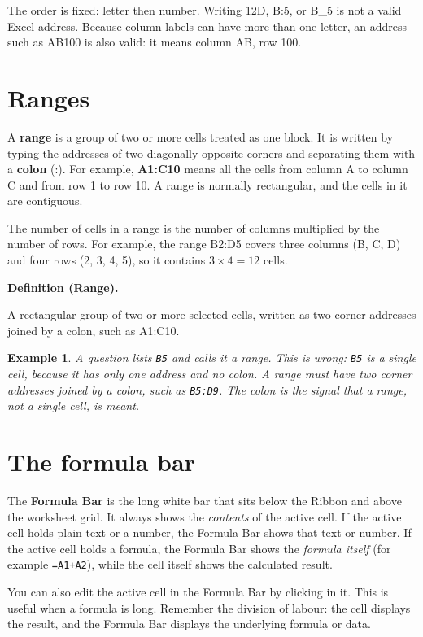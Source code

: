 \documentclass[11pt]{article}
\newtheorem{example}{Example}[section]
\newenvironment{definitionbox}[1]{%
  \par\noindent\textbf{Definition (#1).}\ \itshape
}{\par\vspace{0.3em}}
\begin{document}
The order is fixed: letter then number. Writing 12D, B:5, or B\_5 is not a
valid Excel address. Because column labels can have more than one letter, an
address such as AB100 is also valid: it means column AB, row 100.

\section{Ranges}
A \textbf{range} is a group of two or more cells treated as one block. It is
written by typing the addresses of two diagonally opposite corners and
separating them with a \textbf{colon} (:). For example, \textbf{A1:C10}
means all the cells from column A to column C and from row 1 to row 10. A
range is normally rectangular, and the cells in it are contiguous.

The number of cells in a range is the number of columns multiplied by the
number of rows. For example, the range B2:D5 covers three columns (B, C, D)
and four rows (2, 3, 4, 5), so it contains $3 \times 4 = 12$ cells.

\begin{definitionbox}{Range}
A rectangular group of two or more selected cells, written as two corner
addresses joined by a colon, such as A1:C10.
\end{definitionbox}

\begin{example}
A question lists \texttt{B5} and calls it a range. This is wrong: \texttt{B5}
is a \emph{single} cell, because it has only one address and no colon. A
range must have two corner addresses joined by a colon, such as
\texttt{B5:D9}. The colon is the signal that a range, not a single cell, is
meant.
\end{example}

\section{The formula bar}
The \textbf{Formula Bar} is the long white bar that sits below the Ribbon
and above the worksheet grid. It always shows the \emph{contents} of the
active cell. If the active cell holds plain text or a number, the Formula
Bar shows that text or number. If the active cell holds a formula, the
Formula Bar shows the \emph{formula itself} (for example
\texttt{=A1+A2}), while the cell itself shows the calculated result.

You can also edit the active cell in the Formula Bar by clicking in it. This
is useful when a formula is long. Remember the division of labour: the cell
displays the result, and the Formula Bar displays the underlying formula or
data.
\end{document}
